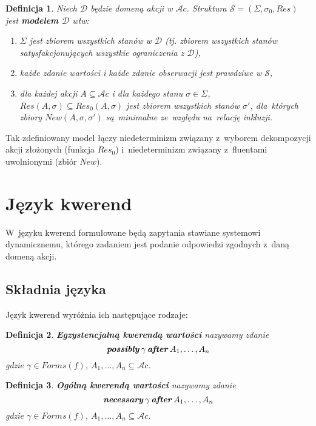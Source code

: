 \documentclass[11pt,a4paper]{article}
\newtheorem{defn}{Definicja}
\DeclareMathOperator{\After}{\textbf{\textit{after}}}
\DeclareMathOperator{\Possibly}{\textbf{\textit{possibly}}}
\DeclareMathOperator{\Necessary}{\textbf{\textit{necessary}}}
\begin{document}
\begin{defn}
    Niech $\mathcal{D}$ będzie domeną akcji w $\mathcal{A}c$. Struktura $\mathcal{S} = (\Sigma,\sigma_0,Res)$ jest \textbf{modelem $\mathcal{D}$} wtw:
    \begin{enumerate}
    \item $\Sigma$ jest zbiorem wszystkich stanów w $\mathcal{D}$ (tj. zbiorem wszystkich stanów satysfakcjonujących wszystkie ograniczenia z $\mathcal{D}$),
    \item każde zdanie wartości i każde zdanie obserwacji jest prawdziwe w $\mathcal{S}$,
    \item dla każdej akcji $A \subseteq \mathcal{A}c$ i dla każdego stanu $\sigma \in \Sigma$, $Res(A,\sigma) \subseteq Res_0(A,\sigma)$ jest zbiorem wszystkich stanów $\sigma'$, dla~których zbiory $New(A,\sigma,\sigma')$ są~minimalne ze~względu na~relację inkluzji.
    \end{enumerate}
\end{defn}

Tak zdefiniowany model łączy niedeterminizm związany z~wyborem dekompozycji akcji złożonych (funkcja $Res_0$) i~niedeterminizm związany z~fluentami uwolnionymi (zbiór $New$).

\section{Język kwerend}

W~języku kwerend formułowane będą zapytania stawiane systemowi dynamicznemu, którego zadaniem jest podanie odpowiedzi zgodnych z~daną domeną akcji.

\subsection{Składnia języka}
    Język kwerend wyróżnia ich następujące rodzaje:

    \begin{defn}
        \textbf{Egzystencjalną kwerendą wartości} nazywamy zdanie
        $$ \Possibly \gamma \After A_1, \dots, A_n $$
        gdzie $\gamma \in Forms(f)$, $A_1, \dots, A_n \subseteq \mathcal{A}c$.
    \end{defn}

    \begin{defn}
        \textbf{Ogólną kwerendą wartości} nazywamy zdanie
        $$ \Necessary \gamma \After A_1, \dots, A_n $$
        gdzie $\gamma \in Forms(f)$, $A_1, \dots, A_n \subseteq \mathcal{A}c$.
    \end{defn}
\end{document}
